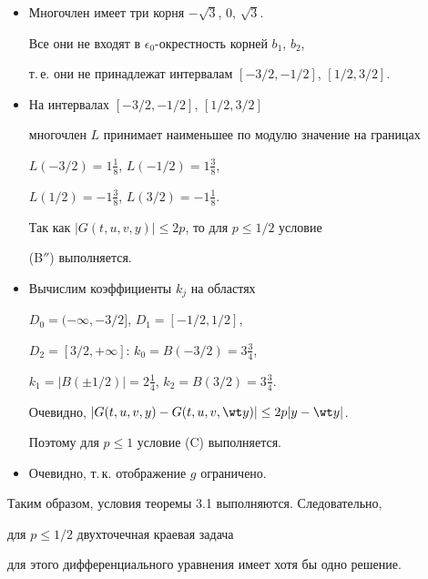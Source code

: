 \begin{itemize}


\item[(A)] Многочлен имеет три корня $-\sqrt 3$, $0$, $\sqrt 3$.


Все они не входят в $\epsilon_0$-окрестность корней $b_1$, $b_2$,


т.\,е. они не принадлежат интервалам $[-3/2, -1/2]$, $[1/2, 3/2]$.


\item[(B$''$)] На интервалах $[-3/2,-1/2]$, $[1/2,3/2]$ 


многочлен $L$ принимает наименьшее по модулю значение на границах


$L(-3/2)= 1\frac 18$, $L(-1/2) =1\frac 38$,


$L(1/2) = -1 \frac 3 8$, $L(3/2) = - 1 \frac 1 8$. 


Так как $|G(t,u,v,y)| \leq 2p$, то для $p\leq 1/2$ условие


(B$''$) выполняется.


\item[(C)] Вычислим коэффициенты $k_j$ на областях


$D_0= (-\infty,-3/2]$, $D_1= [-1/2, 1/2]$,


$D_2 = [3/2, +\infty]$: $k_0 = B(-3/2) = 3\frac 34$, 


$k_1 = |B(\pm 1/2)|= 2\frac 1 4$, $k_2=B(3/2)= 3\frac 34$.


Очевидно, $|G(t,u,v,y)-G(t,u,v,\wt y)|\leq 2p|y-\wt y|$.


Поэтому для $p\leq 1$ условие (C) выполняется.


\item[(D)] Очевидно, т.\,к. отображение $g$ ограничено.


\end{itemize}





Таким образом, условия теоремы 3.1 выполняются. Следовательно,


для $p\leq 1/2$ двухточечная краевая задача 


для этого дифференциального уравнения имеет хотя бы одно решение.






